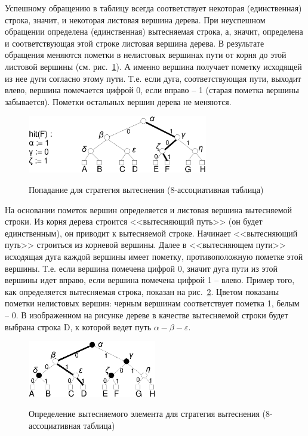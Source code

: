 \begin{enumerate}
Успешному обращению в таблицу всегда соответствует некоторая (единственная) строка, значит, и некоторая листовая вершина дерева. При неуспешном обращении определена (единственная) вытесняемая строка, а, значит, определена и соответствующая этой строке листовая вершина дерева. В результате обращения меняются пометки в нелистовых вершинах пути от корня до этой листовой вершины (см. рис.~\ref{pseudo_lru_hit}). А именно вершина получает пометку
исходящей из нее дуги согласно этому пути. Т.е. если дуга, соответствующая пути, выходит влево, вершина помечается цифрой 0, если вправо -- 1 (старая пометка вершины забывается). Пометки остальных вершин дерева не меняются.

\begin{figure}[h] \center
  \includegraphics[width=0.7\textwidth]{2.theor/plruhit}\\
  \caption{Попадание для стратегия вытеснения \PseudoLRU
  (8-ассоциативная таблица)}\label{pseudo_lru_hit}
\end{figure}

На основании пометок вершин определяется и листовая вершина вытесняемой строки.
Из корня дерева строится <<вытесняющий путь>> (он будет единственным), он приводит к вытесняемой строке. Начинает <<вытесняющий путь>> строиться из корневой вершины. Далее в <<вытесняющем пути>> исходящая дуга каждой вершины имеет пометку, противоположную пометке этой вершины. Т.е. если вершина помечена цифрой 0, значит дуга пути из этой вершины идет вправо, если вершина помечена цифрой 1 -- влево. Пример того, как определяется вытесняемая строка, показан на рис.~\ref{pseudo_lru_miss}. Цветом показаны пометки нелистовых вершин: черным
вершинам соответствует пометка 1, белым -- 0. В изображенном на рисунке дереве в качестве вытесняемой строки будет выбрана строка D, к которой ведет путь $\alpha-\beta-\varepsilon$.

\begin{figure}[h] \center
  \includegraphics[width=0.5\textwidth]{2.theor/plrumiss}\\
  \caption{Определение вытесняемого элемента для стратегия вытеснения
  \PseudoLRU (8-ассоциативная таблица)}\label{pseudo_lru_miss}
\end{figure}



\end{enumerate}
